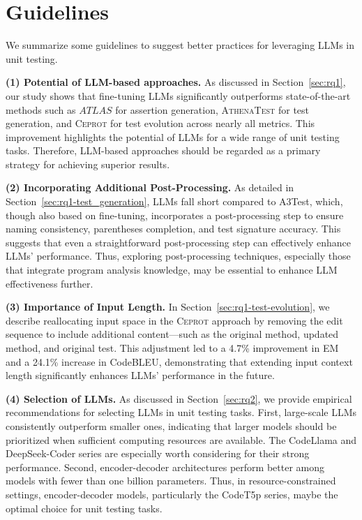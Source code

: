 \section{Guidelines}
\label{sec:implication}

We summarize some guidelines to suggest better practices for leveraging LLMs in unit testing.

\textbf{(1) Potential of LLM-based approaches.} 
As discussed in Section~\ref{sec:rq1}, our study shows that fine-tuning LLMs significantly outperforms state-of-the-art methods such as $ATLAS$ for assertion generation, \textsc{AthenaTest} for test generation, and \textsc{Ceprot} for test evolution across nearly all metrics. This improvement highlights the potential of LLMs for a wide range of unit testing tasks. Therefore, LLM-based approaches should be regarded as a primary strategy for achieving superior results.

\textbf{(2) Incorporating Additional Post-Processing.}
As detailed in Section~\ref{sec:rq1-test_generation}, LLMs 
fall short compared to A3Test, which, though also based on fine-tuning, incorporates a post-processing step to ensure naming consistency, parentheses completion, and test signature accuracy. This suggests that even a straightforward post-processing step can effectively enhance LLMs' performance. Thus, exploring post-processing techniques, especially those that integrate program analysis knowledge, may be essential to enhance LLM effectiveness further.

\textbf{(3) Importance of Input Length.}
In Section~\ref{sec:rq1-test-evolution}, we describe reallocating input space in the \textsc{Ceprot} approach by removing the edit sequence to include additional content—such as the original method, updated method, and original test. This adjustment led to a 4.7\% improvement in EM and a 24.1\% increase in CodeBLEU, demonstrating that extending input context length significantly enhances LLMs' performance in the future.

\textbf{(4) Selection of LLMs.}
As discussed in Section~\ref{sec:rq2}, we provide empirical recommendations for selecting LLMs in unit testing tasks. First, large-scale LLMs consistently outperform smaller ones, indicating that larger models should be prioritized when sufficient computing resources are available. The CodeLlama and DeepSeek-Coder series are especially worth considering for their strong performance. Second, encoder-decoder architectures perform better among models with fewer than one billion parameters. 
Thus, in resource-constrained settings, encoder-decoder models, particularly the CodeT5p series, maybe the optimal choice for unit testing tasks.

